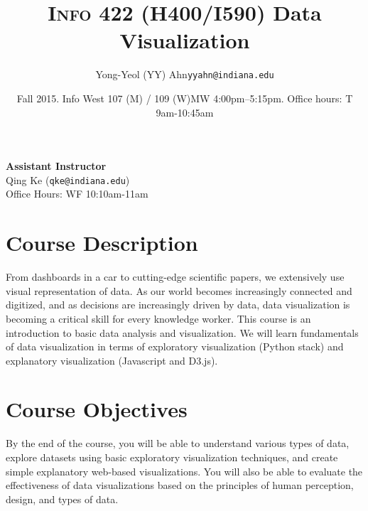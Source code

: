 \documentclass[11pt,article,oneside]{memoir}
\makeatletter
\def\myauthor{Author}
\def\mytitle{Title}
\def\myemail{yyahn@indiana.edu}
\def\myauthor{Yong-Yeol (YY) Ahn}
\def\mytitle{{\normalsize \textsc{Info} 422 (H400/I590) \newline} \HUGE Data Visualization}
\makeatother
\begin{document}

\def\ind{\hangindent=1 true cm\hangafter=1 \noindent}
\def\labelitemi{$\cdot$}


\title{\LARGE \mytitle}     
\author{\Large\myauthor \newline \footnotesize\texttt{\noindent\myemail}}
\date{Fall 2015. Info West 107 (M) / 109 (W)\newline MW 4:00pm--5:15pm. \newline Office hours: T 9am-10:45am}

\maketitle

\vspace{-20pt}
{\bfseries Assistant Instructor} \\ Qing Ke (\texttt{qke@indiana.edu}) \\ Office Hours: WF 10:10am-11am

\section{Course Description}

From dashboards in a car to cutting-edge scientific papers, we extensively use
visual representation of data. As our world becomes increasingly connected and
digitized, and as decisions are increasingly driven by data, data visualization
is becoming a critical skill for every knowledge worker. This course is an
introduction to basic data analysis and visualization. We will learn
fundamentals of data visualization in terms of exploratory visualization
(Python stack) and explanatory visualization (Javascript and D3.js).  


\section{Course Objectives}

By the end of the course, you will be able to understand various types of data,
explore datasets using basic exploratory visualization techniques, and create
simple explanatory web-based visualizations. You will also be able to evaluate
the effectiveness of data visualizations based on the principles of human
perception, design, and types of data. 
 
\end{document}
